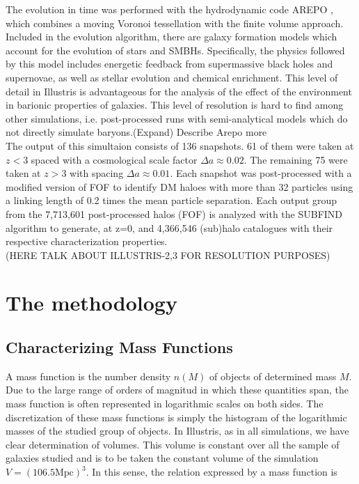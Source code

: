\documentclass[a4paper,fleqn,usenatbib]{mnras}
\begin{document}
The evolution in time was performed with the hydrodynamic code AREPO
\cite{Arepo}, which combines a moving Voronoi tessellation with the
finite volume approach. Included in the evolution algorithm, there are
galaxy formation models which account for the evolution of stars and
SMBHs. Specifically, the physics followed by this model includes
energetic feedback from supermassive black holes and supernovae, as
well as stellar evolution and chemical enrichment. This level of
detail in Illustris is advantageous for the analysis of the effect of
the environment in barionic properties of galaxies. This level of resolution is hard to find
among other simulations, i.e. post-processed runs with semi-analytical
models which do not directly simulate baryons.(Expand) Describe Arepo more\\ 

The output of this simultaion consists of 136 snapshots. 61 of
them were taken at $z < 3$ spaced with a cosmological scale factor
$\Delta a \approx 0.02$. The remaining 75 were taken at $z > 3$
with spacing $\Delta a \approx 0.01$. Each snapshot was post-processed
with a modified version of FOF \cite{FOF} to identify DM haloes with
more than 32 particles using a linking length of 0.2 times the mean
particle separation. Each output group from the 7,713,601 post-processed halos (FOF) is analyzed with the SUBFIND
algorithm \cite{SUBFIND} to generate, at z=0,
and 4,366,546 (sub)halo catalogues with their respective
characterization properties. \\ 

(HERE TALK ABOUT ILLUSTRIS-2,3 FOR RESOLUTION PURPOSES)

\section{The methodology}

\subsection{ Characterizing Mass Functions}
A mass function is the number density $n(M)$ of objects of determined mass $M$.
Due to the large range of orders of magnitud in which these quantities span, the mass function is often represented in logarithmic scales on both sides. 
The discretization of these mass functions is simply the histogram of the logarithmic masses of the studied group of objects. 
In Illustris, as in all simulations, we have clear determination of volumes. This volume is constant over all the sample of galaxies studied and is to be taken the constant volume of the simulation $V = \left(106.5\text{Mpc}\right)^3$. 
In this sense, the relation expressed by a mass function is 
\end{document}
